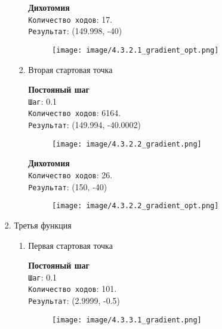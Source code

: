 \documentclass[12pt, a4paper]{article}
\begin{document}
\begin{enumerate}
\begin{enumerate}
\begin{enumerate}
\begin{enumerate}
            \textbf{Дихотомия}\\
            \texttt{Количество ходов}: 17.\\
            \texttt{Результат}: (149.998, -40)
            
            \begin{figure}[h]
            \centering
            \texttt{[image: image/4.3.2.1\_gradient\_opt.png]}
            \end{figure}
            
            \item Вторая стартовая точка

            \textbf{Постояный шаг}\\
            \texttt{Шаг}: 0.1\\
            \texttt{Количество ходов}: 6164.\\
            \texttt{Результат}: (149.994, -40.0002)
            
            \begin{figure}[h]
            \centering
            \texttt{[image: image/4.3.2.2\_gradient.png]}
            \end{figure}

            \textbf{Дихотомия}\\
            \texttt{Количество ходов}: 26.\\
            \texttt{Результат}: (150, -40)
            
            \begin{figure}[h]
            \centering
            \texttt{[image: image/4.3.2.2\_gradient\_opt.png]}
            \end{figure}
            
        \end{enumerate}

        \item Третья функция

        \begin{enumerate}
            \item Первая стартовая точка

            \textbf{Постояный шаг}\\
            \texttt{Шаг}: 0.1\\
            \texttt{Количество ходов}: 101.\\
            \texttt{Результат}: (2.9999, -0.5)
            
            \begin{figure}[h]
            \centering
            \texttt{[image: image/4.3.3.1\_gradient.png]}
            \end{figure}


\end{enumerate}
\end{enumerate}
\end{enumerate}
\end{enumerate}
\end{document}
